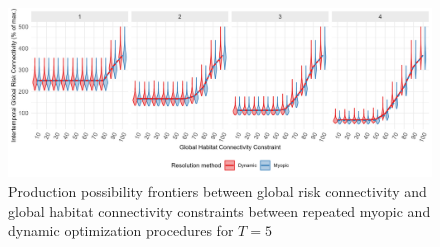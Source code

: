 \begin{figure}[H]
    \centering
    \includegraphics[width=\textwidth]{figures/wildland/dynamic_v_myopic_fpp.jpg}
    \caption{Production possibility frontiers between global risk connectivity and global habitat connectivity constraints between repeated myopic and dynamic optimization procedures for $T=5$}
    \label{fig:appendix_fpp_dyn_myopic}
\end{figure}
\clearpage


